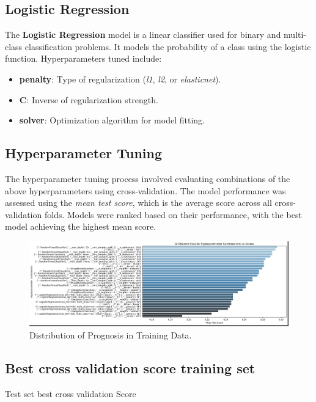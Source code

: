 \documentclass{article}
\begin{document}
\subsection{Logistic Regression}
The \textbf{Logistic Regression} model is a linear classifier used for binary and multi-class classification problems. It models the probability of a class using the logistic function. Hyperparameters tuned include:
\begin{itemize}
    \item \textbf{penalty}: Type of regularization (\textit{l1}, \textit{l2}, or \textit{elasticnet}).
    \item \textbf{C}: Inverse of regularization strength.
    \item \textbf{solver}: Optimization algorithm for model fitting.
\end{itemize}

\subsection{Hyperparameter Tuning}
The hyperparameter tuning process involved evaluating combinations of the above hyperparameters using cross-validation. The model performance was assessed using the \textit{mean test score}, which is the average score across all cross-validation folds. Models were ranked based on their performance, with the best model achieving the highest mean score.

\begin{figure}[h] %
    \centering
    \includegraphics[width=1
    \linewidth]{BenchMark.png}
    \caption{Distribution of Prognosis in Training Data.}
    \label{fig:disease_distribution}
    \vspace{-1em} %
\end{figure}
\subsection {Best cross validation score training set}
Test set best cross validation Score
\end{document}
